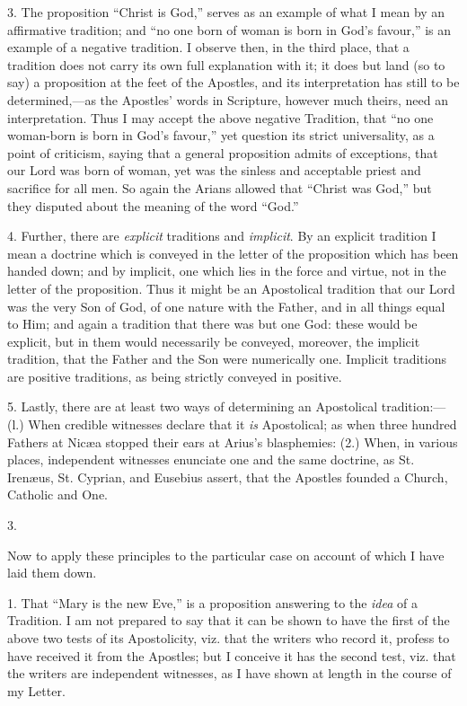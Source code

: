 3. The proposition ``Christ is God,'' serves as an example of
what I mean by an affirmative tradition; and ``no one born of woman
is born in God's favour,'' is an example of a negative tradition. I
observe then, in the third place, that a tradition does not carry its
own full explanation with it; it does but land (so to say) a proposition
at the feet of the Apostles, and its interpretation has still to be
determined,—as the Apostles' words in Scripture, however much theirs,
need an interpretation. Thus I may accept the above negative Tradition,
that ``no one woman-born is born in God's favour,'' yet question
its strict universality, as a point of criticism, saying that a general
proposition admits of exceptions, that our Lord was born of woman, yet
was the sinless and acceptable priest and sacrifice for all men. So
again the Arians allowed that ``Christ was God,'' but they
disputed about the meaning of the word ``God.''


4. Further, there are \emph{explicit} traditions and \emph{implicit}.
By an explicit tradition I mean a doctrine which is conveyed in the
letter of the proposition which has been handed down; and by implicit,
one which lies in the force and virtue, not in the letter of the
proposition. Thus it might be an Apostolical tradition that our Lord was
the very Son of God, of one nature with the Father, and in all things
equal to Him; and again a tradition that there was but one God: these
would be explicit, but in them would necessarily be conveyed, moreover,
the implicit tradition, that the Father and the Son were numerically
one. Implicit traditions are positive traditions, as being
strictly conveyed in positive.


5. Lastly, there are at least two ways of determining an Apostolical
tradition:—(l.) When credible witnesses declare that it \emph{is}
Apostolical; as when three hundred Fathers at Nicæa stopped their ears
at Arius's blasphemies: (2.) When, in various places, independent
witnesses enunciate one and the same doctrine, as St. Irenæus, St.
Cyprian, and Eusebius assert, that the Apostles founded a Church,
Catholic and One.


3.


Now to apply these principles to the particular case on account of
which I have laid them down.


1. That ``Mary is the new Eve,'' is a proposition answering
to the \emph{idea} of a Tradition. I am not prepared to say that it can
be shown to have the first of the above two tests of its Apostolicity,
viz. that the writers who record it, profess to have received it from
the Apostles; but I conceive it has the second test, viz. that the
writers are independent witnesses, as I have shown at length in the
course of my Letter.


